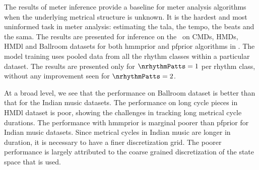 The results of meter inference provide a baseline for meter analysis algorithms when the underlying metrical structure is unknown. It is the hardest and most uninformed task in meter analysis: estimating the \gls{tala}, the tempo, the beats and the \gls{sama}. The results are presented for inference on the \bpmodel\ on \acrshort{CMDs}, \acrshort{HMDs}, \acrshort{HMDl} and Ballroom datasets for both \acrshort{hmmprior} and \acrshort{pfprior} algorithms in . The model training uses pooled data from all the rhythm classes within a particular dataset. The results are presented only for $\nrhythmPatts = 1$ per rhythm class, without any improvement seen for $\nrhythmPatts = 2$. 

At a broad level, we see that the performance on Ballroom dataset is better than that for the Indian music datasets. The performance on long cycle pieces in \acrshort{HMDl} dataset is poor, showing the challenges in tracking long metrical cycle durations. The performance with \acrshort{hmmprior} is marginal poorer than \acrshort{pfprior} for Indian music datasets. Since metrical cycles in Indian music are longer in duration, it is necessary to have a finer discretization grid. The poorer performance is largely attributed to the coarse grained discretization of the state space that is used. 
